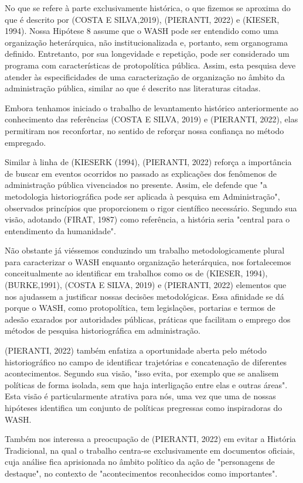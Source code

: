 No que se refere à parte exclusivamente histórica, o que fizemos se aproxima do que é descrito por (COSTA E SILVA,2019), (PIERANTI, 2022) e (KIESER, 1994). Nossa Hipótese 8 assume que o WASH pode ser entendido como uma organização heterárquica, não institucionalizada e, portanto, sem organograma definido. Entretanto, por sua longevidade e repetição, pode ser considerado um programa com características de protopolítica pública. Assim, esta pesquisa deve atender às especificidades de uma caracterização de organização no âmbito da administração pública, similar ao que é descrito nas literaturas citadas.

Embora tenhamos iniciado o trabalho de levantamento histórico anteriormente ao conhecimento das referências (COSTA E SILVA, 2019) e (PIERANTI, 2022), elas permitiram nos reconfortar, no sentido de reforçar nossa confiança no método empregado.

Similar à linha de (KIESERK (1994),  (PIERANTI, 2022) reforça a importância de buscar em eventos ocorridos no passado as explicações dos fenômenos de administração pública vivenciados no presente. Assim, ele defende que "a metodologia historiográfica pode ser aplicada à pesquisa em Administração", observados princípios que proporcionem o rigor científico necessário. Segundo sua visão, adotando (FIRAT, 1987) como referência, a história seria "central para o entendimento da humanidade".

Não obstante já viéssemos conduzindo um trabalho metodologicamente plural para caracterizar o WASH enquanto organização heterárquica, nos fortalecemos conceitualmente ao identificar em trabalhos como os de (KIESER, 1994), (BURKE,1991), (COSTA E SILVA, 2019) e (PIERANTI, 2022) elementos que nos ajudassem a justificar nossas decisões metodológicas. Essa afinidade se dá porque o WASH, como protopolítica, tem legislações, portarias e termos de adesão exarados por autoridades públicas, práticas que facilitam o emprego dos métodos de pesquisa historiográfica em administração.

(PIERANTI, 2022) também enfatiza a oportunidade aberta pelo método historiográfico  no campo de identificar trajetórias e concatenação de diferentes acontecimentos. Segundo sua visão, "isso evita, por exemplo que se analisem políticas de forma isolada, sem que haja interligação entre elas e outras áreas". Esta visão é particularmente atrativa para nós, uma vez que uma de nossas hipóteses identifica um conjunto de políticas pregressas como inspiradoras do WASH.

Também nos interessa a preocupação de (PIERANTI, 2022) em evitar a História Tradicional, na qual o trabalho centra-se exclusivamente em documentos oficiais, cuja análise fica aprisionada no âmbito político da ação de "personagens de destaque", no contexto de "acontecimentos reconhecidos como importantes".

